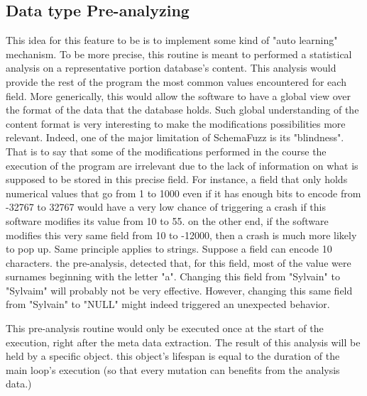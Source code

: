 \documentclass{article}
\begin{document}
\begin{empfile}
		\subsection{Data type Pre-analyzing}
This idea for this feature to be is to implement some kind of "auto learning" mechanism.
To be more precise, this routine is meant to performed a statistical analysis on a representative portion database's content. This analysis would provide the rest of the program the most common values encountered for each field. More generically, this would allow the software to have a global view over the format of the data that the database holds.
Such global understanding of the content format is very interesting to make the modifications possibilities more relevant. Indeed, one of the major limitation of SchemaFuzz is its "blindness".
That is to say that some of the modifications performed in the course the execution of the program are irrelevant due to the lack of information on what is supposed to be stored in this precise field.
For instance, a field that only holds numerical values that go from 1 to 1000 even if it has enough bits to encode from -32767 to 32767 would have a very low chance of triggering a crash if this software modifies its value from 10 to 55.
on the other end, if the software modifies this very same field from 10 to -12000, then a crash is much more likely to pop up.
Same principle applies to strings. Suppose a field can encode 10 characters.
the pre-analysis, detected that, for this field, most of the value were surnames beginning with the letter "a". Changing this field from "Sylvain" to "Sylvaim" will probably not be very effective. However, changing this same field from "Sylvain" to "NULL" might indeed triggered an unexpected behavior. 
  
This pre-analysis routine would only be executed once at the start of the execution, right after the meta data extraction. The result of this analysis will be held by a specific object. 
this object's lifespan is equal to the duration of the main loop's execution (so that every mutation can benefits from the analysis data.)
		

\end{empfile}
\end{document}
